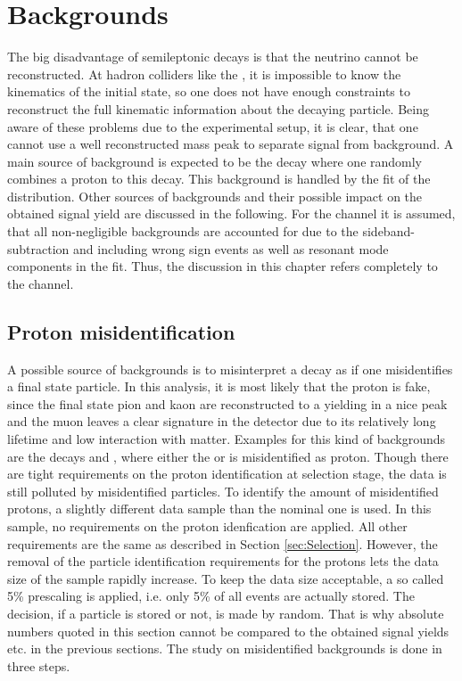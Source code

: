 \chapter{Backgrounds}
\label{sec:Backgrounds}
The big disadvantage of semileptonic decays is that the neutrino cannot be reconstructed.
At hadron colliders like the \lhc, it is impossible to know the kinematics of the initial state, so one does not have enough constraints to reconstruct the full kinematic information about the decaying particle.
Being aware of these problems due to the experimental setup, it is clear, that one cannot use a well reconstructed \Lb mass peak to separate signal from background.
A main source of background is expected to be the decay  where one randomly combines a proton to this decay.
This background is handled by the fit of the \logIP distribution.
Other sources of backgrounds and their possible impact on the obtained signal yield \NDp are discussed in the following.
For the \LbToLcmunu channel it is assumed, that all non-negligible backgrounds are accounted for due to the sideband-subtraction and including wrong sign events as well as resonant mode components in the fit.
Thus, the discussion in this chapter refers completely to the \LbToDpmunuX channel.

\section{Proton misidentification}
\label{sec:BKG_misIDp}
A possible source of backgrounds is to misinterpret a decay as \LbToDpmunuX if one misidentifies a final state particle.
In this analysis, it is most likely that the proton is fake, since the final state pion and kaon are reconstructed to a \Dz yielding in a nice peak and the muon leaves a clear signature in the detector due to its relatively long lifetime and low interaction with matter.
Examples for this kind of backgrounds are the decays  and , where either the \Kp or \pip is misidentified as proton.
Though there are tight requirements on the proton identification at selection stage, the data is still polluted by misidentified particles.
To identify the amount of misidentified protons, a slightly different data sample than the nominal one is used. 
In this sample, no requirements on the proton idenfication are applied.
All other requirements are the same as described in Section \ref{sec:Selection}.
However, the removal of the particle identification requirements for the protons lets the data size of the sample rapidly increase.
To keep the data size acceptable, a so called 5\% prescaling is applied, i.e. only 5\% of all events are actually stored.
The decision, if a particle is stored or not, is made by random.
That is why absolute numbers quoted in this section cannot be compared to the obtained signal yields etc. in the previous sections.
The study on misidentified backgrounds is done in three steps.

